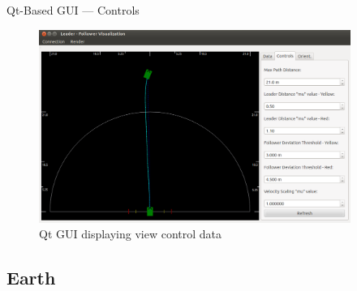 \documentclass{beamer}
\begin{document}
    \begin{frame}{Qt-Based GUI --- Controls}
      \begin{figure}[ht] \centering
        \includegraphics[width=4in] {../graphics/final_design_opts.png}
        \caption{Qt GUI displaying view control data} \label{fig:qt_controls}
      \end{figure}
    \end{frame}


  \subsection{Earth}
\end{document}
